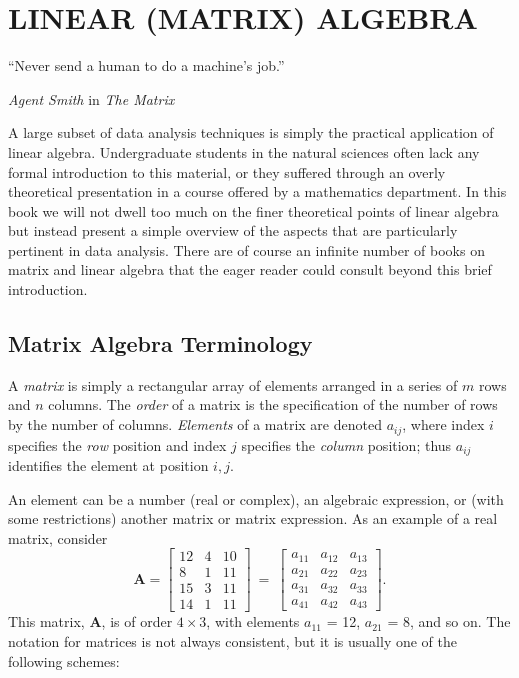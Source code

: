 %
\chapter{LINEAR (MATRIX) ALGEBRA}
\epigraph{``Never send a human to do a machine's job.''}{\textit{Agent Smith} in \textit{The Matrix}}
\label{ch:matrix}
A large subset of data analysis techniques is simply the practical application of
linear algebra.  Undergraduate students in the natural sciences often lack any formal introduction
to this material, or they suffered through an overly theoretical presentation in a course
offered by a mathematics department.  In this book we will not dwell too much on the finer
theoretical points of linear algebra but instead present a simple overview of the aspects that are particularly
pertinent in data analysis.  There are of course an infinite number of books on matrix and
linear algebra that the eager reader could consult beyond this brief introduction.

\section{Matrix Algebra Terminology}

	A \emph{matrix} is simply a rectangular array of elements arranged in a series of $m$  rows and $n$  
columns. The \emph{order} of a matrix is the specification of the number of rows by the number of 
columns. \emph{Elements} of a matrix are denoted $a_{ij}$, where index $i$ specifies the \emph{row} position 
and index $j$ specifies the \emph{column} position; thus $a_{ij}$ identifies the element at position $i,j$.

	An element can be a number (real or complex), an algebraic expression, or (with some 
restrictions) another matrix or matrix expression. As an example of a real matrix,  consider
\begin{equation}
\mathbf{A} = \left[ \begin{array}{rcc}
12 & 4 & 10 \\
8 & 1 & 11\\
15 & 3 & 11\\
14 & 1 & 11
\end{array}   \right]	 
 \ = \
\left[  \begin{array}{ccc}
a_{11} & a_{12} & a_{13} \\
a_{21} & a_{22} & a_{23}\\
a_{31} & a_{32} & a_{33} \\
a_{41} & a_{42} & a_{43}
\end{array} \right].
\end{equation}
This matrix, $\mathbf A$, is of order $4 \times 3$, with elements $a_{11}$ = 12, $a_{21}$ = 8, and so on. The notation for matrices is 
not always consistent, but it is usually one of the following schemes:

